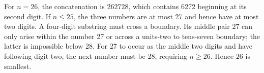 For $n=26$, the concatenation is $262728$, which contains 6272 beginning at its second digit. If $n\le25$, the three numbers are at most 27 and hence have at most two digits. A four-digit substring must cross a boundary. Its middle pair 27 can only arise within the number 27 or across a units-two to tens-seven boundary; the latter is impossible below 28. For 27 to occur as the middle two digits and have following digit two, the next number must be 28, requiring $n\ge26$. Hence $\boxed{26}$ is smallest.
